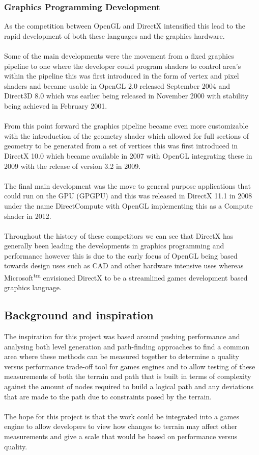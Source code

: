 \subsubsection{Graphics Programming Development}
As the competition between OpenGL and DirectX intensified this lead to the rapid development of both these languages and the graphics hardware.\\\\ Some of the main developments were the movement from a fixed graphics pipeline to one where the developer could program shaders to control area's within the pipeline this was first introduced in the form of vertex and pixel shaders and became usable in OpenGL 2.0 released September 2004\cite{OGLHistWiki} and Direct3D 8.0 which was earlier being released in November 2000 with stability being achieved in February 2001\cite{D3DHistWiki}.\\\\From this point forward the graphics pipeline became even more customizable with the introduction of the geometry shader which allowed for full sections of geometry to be generated from a set of vertices this was first introduced in DirectX 10.0 which became available in 2007 with OpenGL integrating these in 2009 with the release of version 3.2 in 2009.\\\\The final main development was the move to general purpose applications that could run on the GPU (GPGPU) and this was released in DirectX 11.1 in 2008 under the name DirectCompute with OpenGL implementing this as a Compute shader in 2012.\\\\ Throughout the history of these competitors we can see that DirectX has generally been leading the developments in graphics programming and performance however this is due to the early focus of OpenGL being based towards design uses such as CAD and other hardware intensive uses whereas Microsoft\textsuperscript{tm} envisioned DirectX to be a streamlined games development based graphics language.         
 
\subsection{Background and inspiration}
The inspiration for this project was based around pushing performance and analysing both level generation and path-finding approaches to find a common area where these methods can be measured together to determine a quality versus performance trade-off tool for games engines and to allow testing of these measurements of both the terrain and path that is built in terms of complexity against the amount of nodes required to build a logical path and any deviations that are made to the path due to constraints posed by the terrain.\\\\ The hope for this project is that the work could be integrated into a games engine to allow developers to view how changes to terrain may affect other measurements and give a scale that would be based on performance versus quality.   

